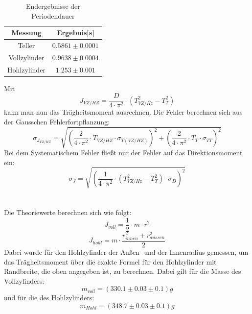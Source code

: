 \documentclass[12pt,a4paper]{article}
\begin{document}
\begin{table}[H]
\caption{Endergebnisse der Periodendauer}
\begin{center}
\begin{tabular}{|c|c|}
\hline
Messung &  Ergebnis[s]  \\
\hline
Teller &  $0.5861 \pm 0.0001$ \\
\hline
Vollzylinder &  $0.9638 \pm 0.0004$ \\
\hline
Hohlzylinder &  $1.253 \pm  0.001$ \\
\hline
\end{tabular}
\end{center}
\label{tab:Zylinder_Mittel}
\end{table}
Mit
\begin{equation}
J_{VZ/HZ} = \dfrac{D}{4\cdot \pi^{2}}\cdot (T_{VZ/Hz}^{2}-T_T^2)
\end{equation}
kann man nun das Trägheitsmoment ausrechnen. Die Fehler berechnen sich aus der Gausschen Fehlerfortpflanzung:
\begin{equation}
\sigma_{J_{VZ/HZ}} = \sqrt{(\dfrac{2}{4\cdot \pi^{2}}\cdot T_{VZ/HZ}\cdot \sigma_{T(VZ/HZ)})^2+ (\dfrac{2}{4\cdot \pi^{2}}\cdot T_{T}\cdot \sigma_{TT} )^2}
\end{equation}
Bei dem Systematischem Fehler fließt nur der Fehler auf das Direktionsmoment ein:
\begin{equation}
\sigma_J = \sqrt{(\dfrac{1}{4\cdot \pi^{2}}\cdot (T_{VZ/Hz}^{2}-T_T^2)\cdot \sigma_D )^2}
\end{equation}\\
\\
Die Theoriewerte berechnen sich wie folgt:
\begin{equation}
J_{voll} = \dfrac{1}{2}\cdot m\cdot r^2
\end{equation}
\begin{equation}
J_{hohl} =m\cdot \dfrac{r_{innen}^2+r_{aussen}^2}{2}
\end{equation}
Dabei wurde für den Hohlzylinder der Außen- und der Innenradius gemessen, um das Trägheitsmoment über die exakte Formel für den Hohlzylinder mit Randbreite, die oben angegeben ist, zu berechnen.
Dabei gilt für die Masse des Vollzylinders:
\begin{equation}
m_{voll} = (330.1\pm 0.03\pm 0.1) \si{g}
\end{equation}
und für die des Hohlzylinders:
\begin{equation}
m_{Hohl} = (348.7\pm 0.03\pm 0.1) \si{g}
\end{equation}
\end{document}
